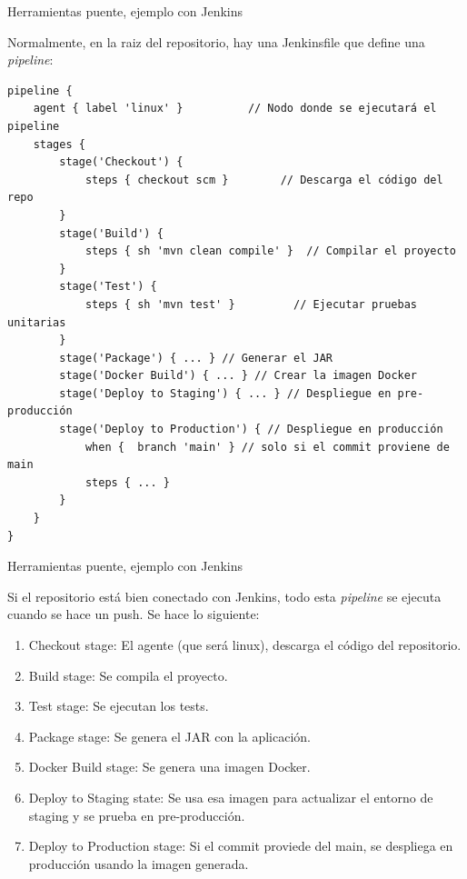 \documentclass{beamer}
\begin{document}
\begin{frame}[fragile]{Herramientas puente, ejemplo con Jenkins}

Normalmente, en la raiz del repositorio, hay una Jenkinsfile que define una \textit{pipeline}:


\begin{verbatim}
pipeline {
    agent { label 'linux' }          // Nodo donde se ejecutará el pipeline
    stages {
        stage('Checkout') {
            steps { checkout scm }        // Descarga el código del repo 
        }
        stage('Build') {
            steps { sh 'mvn clean compile' }  // Compilar el proyecto
        }
        stage('Test') {
            steps { sh 'mvn test' }         // Ejecutar pruebas unitarias
        }
        stage('Package') { ... } // Generar el JAR
        stage('Docker Build') { ... } // Crear la imagen Docker
        stage('Deploy to Staging') { ... } // Despliegue en pre-producción
        stage('Deploy to Production') { // Despliegue en producción
            when {  branch 'main' } // solo si el commit proviene de main
            steps { ... }
        }
    }
}   
\end{verbatim}

\end{frame}

\begin{frame}{Herramientas puente, ejemplo con Jenkins}

Si el repositorio está bien conectado con Jenkins, todo esta \textit{pipeline} se ejecuta cuando se hace un push. Se hace lo siguiente:

\begin{enumerate}
    \item Checkout stage: El agente (que será linux), descarga el código del repositorio.
    \item Build stage: Se compila el proyecto.
    \item Test stage: Se ejecutan los tests.
    \item Package stage: Se genera el JAR con la aplicación.
    \item Docker Build stage: Se genera una imagen Docker.
    \item Deploy to Staging state: Se usa esa imagen para actualizar el entorno de staging y se prueba en pre-producción.
    \item Deploy to Production stage: Si el commit proviede del main, se despliega en producción usando la imagen generada.
\end{enumerate}
    
\end{frame}
\end{document}
